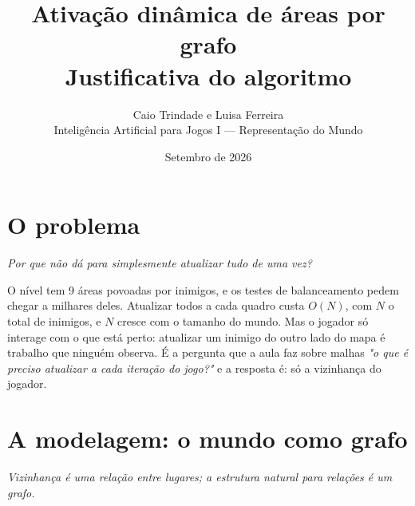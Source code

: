 \documentclass[11pt,a4paper]{article}
\title{\textbf{Ativação dinâmica de áreas por grafo}\\[0.3em]
  \large Justificativa do algoritmo}
\author{Caio Trindade e Luisa Ferreira\\
  \small Inteligência Artificial para Jogos I --- Representação do Mundo}
\date{Setembro de 2026}
\newcommand{\gancho}[1]{\textcolor{destaque}{\textit{#1}}\par}
\begin{document}
\maketitle

\section{O problema}

\gancho{Por que não dá para simplesmente atualizar tudo de uma vez?}

O nível tem 9 áreas povoadas por inimigos, e os testes de balanceamento pedem
chegar a milhares deles. Atualizar todos a cada quadro custa $O(N)$, com $N$ o
total de inimigos, e $N$ cresce com o tamanho do mundo. Mas o jogador só
interage com o que está perto: atualizar um inimigo do outro lado do mapa é
trabalho que ninguém observa. É a pergunta que a aula faz sobre malhas
\emph{"o que é preciso atualizar a cada iteração do jogo?"} e a resposta é:
só a vizinhança do jogador.

\section{A modelagem: o mundo como grafo}

\gancho{Vizinhança é uma relação entre lugares; a estrutura natural para
relações é um grafo.}

\begin{figure}
  \vspace{-1.2em}
  \centering
  \par\vspace{0.3em}{\small Malha $3\times3$ com diagonais (cinza): grau 3 nos cantos, 5 nas bordas, 8 no centro.\par}
  \vspace{-1.5em}
\end{figure}
\end{document}
